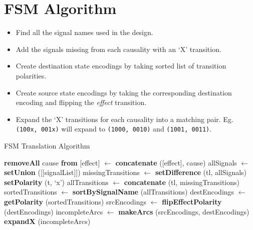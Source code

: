 \section{FSM Algorithm}\label{sec:algo}
\begin{itemize}
	\item Find all the signal names used in the design.
	\item Add the signals missing from each causality with an `X'
		transition.
	\item Create destination state encodings by taking sorted list of
		transition polarities.
	\item Create source state encodings by taking the corresponding
		destination encoding and flipping the \emph{effect} transition.
	\item Expand the `X' transitions for each causality into a matching
		pair. Eg. \texttt{(100x, 001x)} will expand to \texttt{(1000,
		0010)} and \texttt{(1001, 0011)}.
\end{itemize}

\begin{algorithm}[]
\begin{algorithmic}
	\caption{FSM Translation Algorithm\label{alg:fsm}}
		\State \textbf{removeAll} cause \textbf{from} [effect]
		\State [signalList] $\leftarrow$ \textbf{concatenate} ([effect], cause)
	\EndFor
	\State allSignals $\leftarrow$ \textbf{setUnion} ([[signalList]])
		\State missingTransitions $\leftarrow$ \textbf{setDifference} (tl, allSignals)
			\State \textbf{setPolarity} (t, `x')
		\EndFor
		\State allTransitions $\leftarrow$ \textbf{concatenate} (tl, missingTransitions)
		\State sortedTransitions $\leftarrow$ \textbf{sortBySignalName} (allTransitions)
		\State destEncodings $\leftarrow$ \textbf{getPolarity} (sortedTransitions)
		\State srcEncodings $\leftarrow$ \textbf{flipEffectPolarity} (destEncodings)
		\State incompleteArcs $\leftarrow$ \textbf{makeArcs} (srcEncodings, destEncodings)
		\State \textbf{expandX} (incompleteArcs)
	\EndFor
\end{algorithmic}
\end{algorithm}
